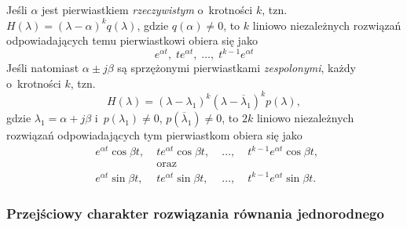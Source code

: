 \documentclass[paper=a4,DIV=12]{lpas}
\begin{document}
Jeśli $\alpha$ jest pierwiastkiem {\em rzeczywistym} o~krotności $k$,
tzn. $H(\lambda) = (\lambda - \alpha)^k q(\lambda)$, gdzie
$q(\alpha) \neq 0$, to $k$ liniowo niezależnych rozwiązań odpowiadających
temu pierwiastkowi obiera się jako
\begin{equation}
  e^{\alpha t}, \; t e^{\alpha t},\; \dots,\; t^{k-1} e^{\alpha t}
  \label{eq:Y77IL}
\end{equation}
Jeśli natomiast $\alpha \pm j \beta$ są sprzężonymi pierwiastkami {\em
zespolonymi}, każdy o~krotności $k$, tzn.
\begin{equation}
  H(\lambda) = (\lambda - \lambda_1)^k (\lambda - \overline{\lambda}_1)^k p(\lambda),
  \label{eq:P0DR4}
\end{equation}
gdzie $\lambda_1 = \alpha + j \beta$ i~$p(\lambda_1) \neq 0$, $p(\overline{\lambda}_1) \neq 0$,
to $2k$ liniowo niezależnych rozwiązań odpowiadających tym pierwiastkom
obiera się jako
\begin{equation}
  \begin{aligned}
    & e^{\alpha t} \cos{\beta t}, \;
    & t e^{\alpha t} \cos{\beta t}, \;
    & \dots, \;
    & t^{k-1} e^{\alpha t} \cos{\beta t}, \;
    \\
    & & \text{oraz} & &
    \\
    & e^{\alpha t} \sin{\beta t}, \;
    & t e^{\alpha t} \sin{\beta t}, \;
    & \dots, \;
    & t^{k-1} e^{\alpha t} \sin{\beta t}. \;
  \end{aligned}
  \label{eq:0TFLL}
\end{equation}

\subsubsection{Przejściowy charakter rozwiązania równania jednorodnego}
\label{sec:V185P}
\end{document}
